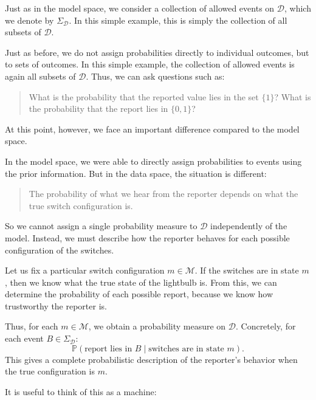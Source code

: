 \documentclass[11pt]{article}
\theoremstyle{remark}
\newcommand{\modelspace}{\mathcal{M}}
\newcommand{\dataspace}{\mathcal{D}}
\begin{document}
Just as in the model space, we consider a collection of allowed events on \(\dataspace\), which we denote by \(\Sigma_{\dataspace}\). In this simple example, this is simply the collection of all subsets of \(\dataspace\).

Just as before, we do not assign probabilities directly to individual outcomes, but to sets of outcomes. In this simple example, the collection of allowed events is again all subsets of \(\dataspace\). Thus, we can ask questions such as:
\begin{quote}
What is the probability that the reported value lies in the set \(\{1\}\)?
What is the probability that the report lies in \(\{0,1\}\)?
\end{quote}

At this point, however, we face an important difference compared to the model space.

\vspace{2mm}

In the model space, we were able to directly assign probabilities to events using the prior information. But in the data space, the situation is different:

\begin{quote}
The probability of what we hear from the reporter depends on what the true switch configuration is.
\end{quote}

So we cannot assign a single probability measure to \(\dataspace\) independently of the model. Instead, we must describe how the reporter behaves for each possible configuration of the switches.

\vspace{2mm}

Let us fix a particular switch configuration \(m \in \modelspace\). If the switches are in state \(m\), then we know what the true state of the lightbulb is. From this, we can determine the probability of each possible report, because we know how trustworthy the reporter is.

Thus, for each \(m \in \modelspace\), we obtain a probability measure on \(\dataspace\). Concretely, for each event \(B \in \Sigma_{\dataspace}\):
\[
\mathbb P(\text{report lies in } B \mid \text{switches are in state } m).
\]
This gives a complete probabilistic description of the reporter's behavior when the true configuration is \(m\).

\vspace{2mm}

It is useful to think of this as a machine:
\end{document}
